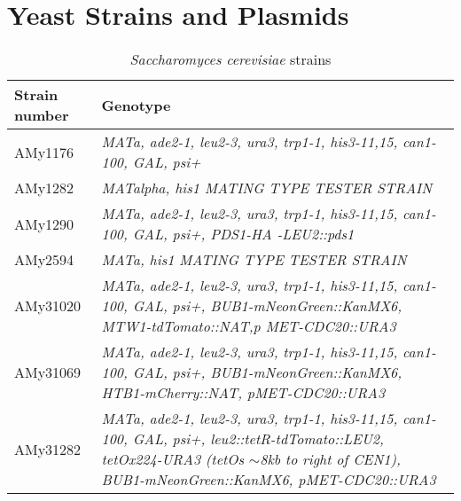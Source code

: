 \chapter{Yeast Strains and Plasmids}
\label{append:strainsplasmids}

\begin{table}[htb]
\centering
\renewcommand{\arraystretch}{1.5}
\caption{\textit{Saccharomyces cerevisiae} strains}
\label{tab:cerevisiaetable}
\begin{tabular}{p{}p{}}
\hline
\textbf{Strain number} & \textbf{Genotype}
\\
\hline
AMy1176       & \textit{MATa, ade2-1, leu2-3, ura3, trp1-1, his3-11,15, can1-100, GAL,   psi+}                                                                                                                                                       \\
AMy1282       & \textit{MATalpha, his1 MATING TYPE   TESTER STRAIN}                                                                                                                                                                                  \\
AMy1290       & \textit{MATa, ade2-1, leu2-3, ura3, trp1-1, his3-11,15, can1-100, GAL,   psi+, PDS1-HA -LEU2::pds1}                                                                                                                                  \\
AMy2594       & \textit{MATa, his1 MATING TYPE TESTER   STRAIN}                                                                                                                                                                                      \\
AMy31020      & \textit{MATa, ade2-1, leu2-3, ura3, trp1-1, his3-11,15, can1-100, GAL,   psi+, BUB1-mNeonGreen::KanMX6, MTW1-tdTomato::NAT,p MET-CDC20::URA3}                                                                                        \\
AMy31069      & \textit{MATa, ade2-1, leu2-3, ura3,   trp1-1, his3-11,15, can1-100, GAL, psi+, BUB1-mNeonGreen::KanMX6,   HTB1-mCherry::NAT, pMET-CDC20::URA3}                                                                                       \\
AMy31282      & \textit{MATa, ade2-1, leu2-3, ura3, trp1-1, his3-11,15, can1-100, GAL,   psi+, leu2::tetR-tdTomato::LEU2, tetOx224-URA3 (tetOs $\sim$8kb to right of CEN1),   BUB1-mNeonGreen::KanMX6, pMET-CDC20::URA3}                             \\

\end{tabular}
\end{table}
